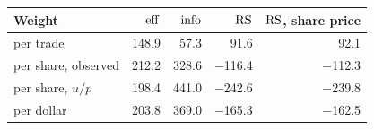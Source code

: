 \begin{tabular}{lrrrr}
\toprule
Weight & $\mathrm{eff}$ & $\mathrm{info}$ & $\mathrm{RS}$ & $\mathrm{RS}$, share price \\
\midrule
per trade & 148.9 & 57.3 & 91.6 & 92.1 \\
per share, observed & 212.2 & 328.6 & \ensuremath{-}116.4 & \ensuremath{-}112.3 \\
per share, $u/p$ & 198.4 & 441.0 & \ensuremath{-}242.6 & \ensuremath{-}239.8 \\
per dollar & 203.8 & 369.0 & \ensuremath{-}165.3 & \ensuremath{-}162.5 \\
\bottomrule
\end{tabular}
